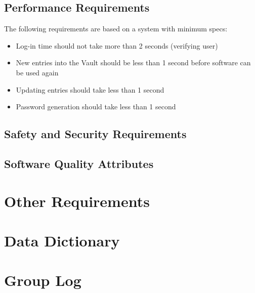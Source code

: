\documentclass[12pt]{report}
\begin{document}
\section{Performance Requirements}
The following requirements are based on a system with minimum specs:
\begin{itemize}
    \item Log-in time should not take more than 2 seconds (verifying user)
    \item New entries into the Vault should be less than 1 second before software can be used again
    \item Updating entries should take less than 1 second
    \item Password generation should take less than 1 second
\end{itemize}

\section{Safety and Security Requirements}


\section{Software Quality Attributes}




\chapter{Other Requirements}

\begin{appendices}
    \chapter{Data Dictionary}
    \chapter{Group Log}
\end{appendices}
\end{document}

